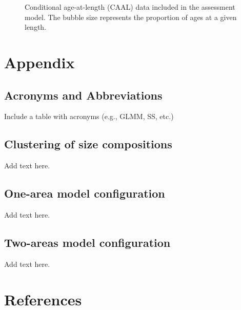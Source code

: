 \documentclass[
]{scrartcl}
\begin{document}
\newpage{}

\begin{figure}


\caption{\label{fig-caal}Conditional age-at-length (CAAL) data included
in the assessment model. The bubble size represents the proportion of
ages at a given length.}

\end{figure}%

\newpage{}

\section{Appendix}\label{appendix}

\subsection{Acronyms and
Abbreviations}\label{acronyms-and-abbreviations}

Include a table with acronyms (e.g., GLMM, SS, etc.)

\newpage{}

\subsection{Clustering of size
compositions}\label{clustering-of-size-compositions}

Add text here.

\newpage{}

\subsection{One-area model
configuration}\label{one-area-model-configuration}

Add text here.

\newpage{}

\subsection{Two-areas model
configuration}\label{two-areas-model-configuration}

Add text here.

\newpage{}

\section*{References}\label{references}
\end{document}
